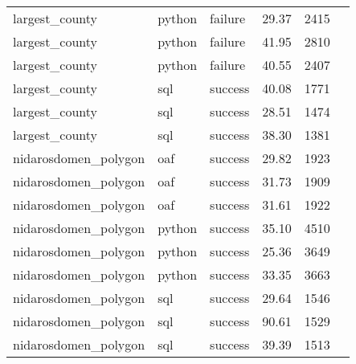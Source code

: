 \begin{longtable}{lp{1.8cm}p{1.8cm}p{1.8cm}p{1.8cm}p{1.8cm}}
    largest\_county            & python                       & failure          & 29.37                         & 2415            \\
    largest\_county            & python                       & failure          & 41.95                         & 2810            \\
    largest\_county            & python                       & failure          & 40.55                         & 2407            \\
    largest\_county            & sql                          & success          & 40.08                         & 1771            \\
    largest\_county            & sql                          & success          & 28.51                         & 1474            \\
    largest\_county            & sql                          & success          & 38.30                         & 1381            \\
    nidarosdomen\_polygon      & oaf                          & success          & 29.82                         & 1923            \\
    nidarosdomen\_polygon      & oaf                          & success          & 31.73                         & 1909            \\
    nidarosdomen\_polygon      & oaf                          & success          & 31.61                         & 1922            \\
    nidarosdomen\_polygon      & python                       & success          & 35.10                         & 4510            \\
    nidarosdomen\_polygon      & python                       & success          & 25.36                         & 3649            \\
    nidarosdomen\_polygon      & python                       & success          & 33.35                         & 3663            \\
    nidarosdomen\_polygon      & sql                          & success          & 29.64                         & 1546            \\
    nidarosdomen\_polygon      & sql                          & success          & 90.61                         & 1529            \\
    nidarosdomen\_polygon      & sql                          & success          & 39.39                         & 1513            \\

\end{longtable}

